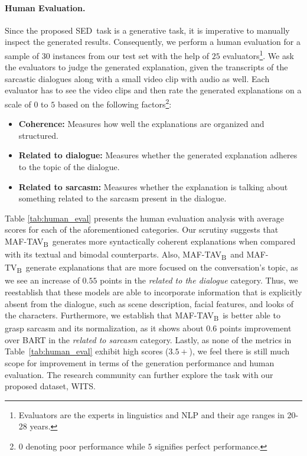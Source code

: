 \documentclass[11pt]{article}
\newcommand{\dataset}{\textsc{WITS}}
\newcommand{\modelTV}{\textsc{MAF-TV\textsubscript{B}}}
\newcommand{\modelTAV}{\textsc{MAF-TAV\textsubscript{B}}}
\newcommand{\task}{\textsc{SED}}
\begin{document}
\paragraph{Human Evaluation.}
Since the proposed \task\ task is a generative task, it is imperative to manually inspect the generated results. Consequently, we perform a human evaluation for a sample of $30$ instances from our test set with the help of $25$ evaluators\footnote{Evaluators are the experts in linguistics and NLP and their age ranges in 20-28 years.}. We ask the evaluators to judge the generated explanation, given the transcripts of the sarcastic dialogues along with a small video clip with audio as well. Each evaluator has to see the video clips and then rate the generated explanations on a scale of $0$ to $5$ based on the following factors\footnote{$0$ denoting poor performance while $5$ signifies perfect performance.}:
\begin{itemize}[leftmargin=*,topsep=0pt]
\setlength{\itemsep}{0pt}
\setlength{\parskip}{0pt}
\setlength{\parsep}{0pt}
    \item \textbf{Coherence:} Measures how well the explanations are organized and structured.
    \item \textbf{Related to dialogue:} Measures whether the generated explanation adheres to the topic of the dialogue.
    \item \textbf{Related to sarcasm:} Measures whether the explanation is talking about something related to the sarcasm present in the dialogue.
\end{itemize}
Table \ref{tab:human_eval} presents the human evaluation analysis with average scores for each of the aforementioned categories. Our scrutiny suggests that \modelTAV\ generates more syntactically coherent explanations when compared with its textual and bimodal counterparts. Also, \modelTAV\ and \modelTV\ generate explanations that are more focused on the conversation's topic, as we see an increase of $0.55$ points in the \textit{related to the dialogue} category. Thus, we reestablish that these models are able to incorporate information that is explicitly absent from the dialogue, such as scene description, facial features, and looks of the characters. Furthermore, we establish that \modelTAV\ is better able to grasp sarcasm and its normalization, as it shows about $0.6$ points improvement over BART in the \textit{related to sarcasm} category. Lastly, as none of the metrics in Table~\ref{tab:human_eval} exhibit high scores ($3.5+$), we feel there is still much scope for improvement in terms of the generation performance and human evaluation. The research community can further explore the task with our proposed dataset, \dataset.
\end{document}
